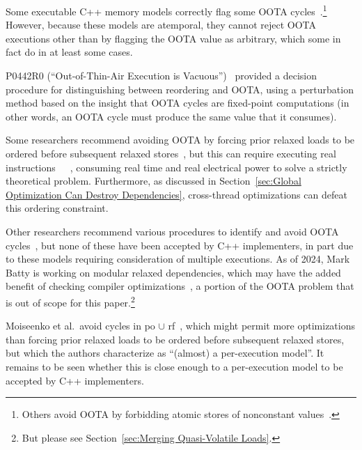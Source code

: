 Some executable C++ memory models correctly flag some OOTA
cycles~\cite{JadeAlglave2014HerdingCats}.\footnote{
	Others avoid OOTA by forbidding atomic stores of nonconstant
	values~\cite{MarkBatty2011cppmem}.}
However, because these models are atemporal, they cannot reject
OOTA executions other than by flagging the OOTA value as arbitrary,
which some in fact do in at least some cases.

P0442R0 (``Out-of-Thin-Air Execution is Vacuous'')~\cite{PaulEMcKenney2016OOTA}
provided a decision procedure for distinguishing between reordering and
OOTA, using a perturbation method based on the insight that OOTA cycles
are fixed-point computations
(in other words, an OOTA cycle must produce the same value that it consumes).

Some researchers recommend avoiding OOTA by forcing prior relaxed
loads to be ordered before subsequent relaxed
stores~\cite{Boehm:2014:OGA:2618128.2618134,HansBoehm2019OOTArevisitedAgain,Lahav:2017:RSC:3062341.3062352,PiezhaoOu2018OOTApapl,SungHwanLee2023WeakMemoryPromising,LukeGeeson2023TightenRelaxed},
but this can require executing real
instructions~\cite[Section 7.1]{Maranget2012TutorialARMPower}~\cite{RichardGrisenthwaite2023TightenRelaxedJustSayNo}~\cite[Section 8.10.4]{NVIDIA-PTX2026},
consuming real time and real electrical power to solve a strictly
theoretical problem.
Furthermore, as discussed in
Section~\ref{sec:Global Optimization Can Destroy Dependencies},
cross-thread optimizations can defeat this ordering constraint.

Other researchers recommend various procedures to identify and avoid OOTA
cycles~\cite{Lahav:2017:RSC:3062341.3062352,Sinclair:2017:CAR:3079856.3080206,Lee:10.1145/3385412.3386010,MarkBatty2019ModularRelaxedDependenciesOOTA,MinkiCho2021PromisingSemantics,SohamChakraborty2019OOTAeventStructure,JeehoonKang2017PromisingSemantics,JeanPichonPharabod2016OOTA},
but none of these have been accepted by C++ implementers, in part due
to these models requiring consideration of multiple executions.
As of 2024, Mark Batty is working on modular relaxed dependencies,
which may have the added benefit of checking compiler
optimizations~\cite{JayRichards2024SymbolicMrder}, a portion
of the OOTA problem that is out of scope for this paper.\footnote{
	But please see Section~\ref{sec:Merging Quasi-Volatile Loads}.}

Moiseenko et al.~avoid cycles in po $\cup$
rf~\cite{EvgeniiMoiseenko2025reexecution}, which might permit
more optimizations than forcing prior relaxed loads to be ordered
before subsequent relaxed stores, but which the authors characterize
as ``(almost) a per-execution model''.
It remains to be seen whether this is close enough to a per-execution
model to be accepted by C++ implementers.

